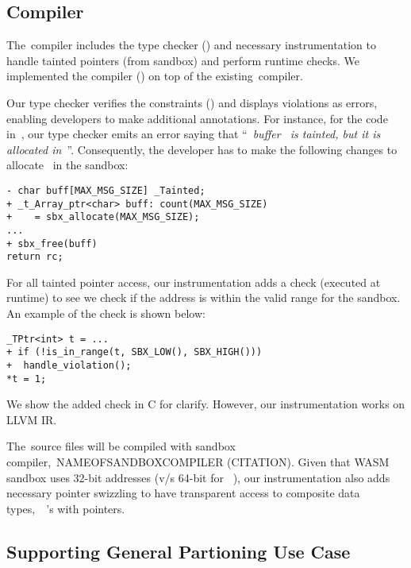 \subsection{Compiler}
The~\systemname compiler includes the type checker () and necessary instrumentation to handle tainted pointers (\ie from sandbox) and perform runtime checks.
We implemented the compiler (\numcompilerlines{}) on top of the existing~\checkedc compiler.

Our type checker verifies the constraints () and displays violations as errors, enabling developers to make additional annotations.
For instance, for the code in~, our type checker emits an error saying that ``~\emph{buffer~ is tainted, but it is allocated in~\cregion}''.
Consequently, the developer has to make the following changes to allocate~ in the sandbox:
\begin{verbatim}
- char buff[MAX_MSG_SIZE] _Tainted;
+ _t_Array_ptr<char> buff: count(MAX_MSG_SIZE)
+    = sbx_allocate(MAX_MSG_SIZE);
...
+ sbx_free(buff)
return rc;
\end{verbatim}

For all tainted pointer access, our instrumentation adds a check (executed at runtime) to see we check if the address is within the valid range for the sandbox. An example of the check is shown below:
\begin{verbatim}
_TPtr<int> t = ...
+ if (!is_in_range(t, SBX_LOW(), SBX_HIGH()))
+  handle_violation();
*t = 1;
\end{verbatim}
We show the added check in C for clarify. However, our instrumentation works on LLVM IR.

The~\ucregion source files will be compiled with sandbox compiler,~\ie NAMEOFSANDBOXCOMPILER (CITATION).
Given that WASM sandbox uses 32-bit addresses (v/s 64-bit for~
\cregion), our instrumentation also adds necessary pointer swizzling to have transparent access to composite data types,~\ie~'s with pointers. 

\subsection{Supporting General Partioning Use Case}


